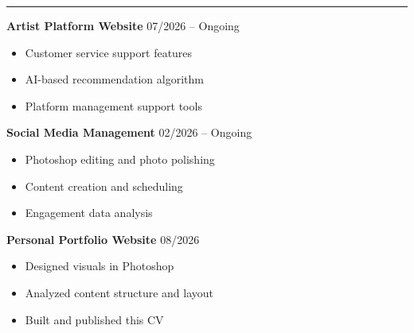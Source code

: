 \documentclass[10pt,a4paper]{article}
\newcommand{\cvsection}[1]{%
  \par\vspace{4pt}{\color{brandbrown}\large\bfseries #1}\par\vspace{2pt}%
  \textcolor{brandtan!60}{\rule{\linewidth}{1.2pt}}\par\vspace{6pt}%
}
\begin{document}
\begin{minipage}[t]{0.47\linewidth}

\cvsection{Projects}

\colorbox{cardbg}{\begin{minipage}{0.95\linewidth}\vspace{4pt}
\textbf{Artist Platform Website} \hfill {\small\color{textmuted}07/2026 -- Ongoing}\\[2pt]
{\small
\begin{itemize}[leftmargin=14pt,itemsep=1pt,topsep=2pt]
  \item Customer service support features
  \item AI-based recommendation algorithm
  \item Platform management support tools
\end{itemize}}
\vspace{2pt}\end{minipage}}

\vspace{6pt}
\colorbox{cardbg}{\begin{minipage}{0.95\linewidth}\vspace{4pt}
\textbf{Social Media Management} \hfill {\small\color{textmuted}02/2026 -- Ongoing}\\[2pt]
{\small
\begin{itemize}[leftmargin=14pt,itemsep=1pt,topsep=2pt]
  \item Photoshop editing and photo polishing
  \item Content creation and scheduling
  \item Engagement data analysis
\end{itemize}}
\vspace{2pt}\end{minipage}}

\vspace{6pt}
\colorbox{cardbg}{\begin{minipage}{0.95\linewidth}\vspace{4pt}
\textbf{Personal Portfolio Website} \hfill {\small\color{textmuted}08/2026}\\[2pt]
{\small
\begin{itemize}[leftmargin=14pt,itemsep=1pt,topsep=2pt]
  \item Designed visuals in Photoshop
  \item Analyzed content structure and layout
  \item Built and published this CV
\end{itemize}}
\vspace{2pt}\end{minipage}}

\end{minipage}
\end{document}
